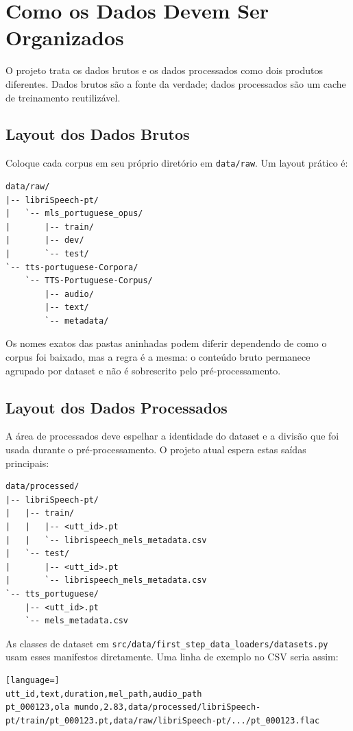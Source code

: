 \documentclass[11pt]{article}
\newcommand{\pathtt}[1]{\texttt{#1}}
\begin{document}
\section{Como os Dados Devem Ser Organizados}

O projeto trata os dados brutos e os dados processados como dois produtos diferentes. Dados brutos são a fonte da verdade; dados processados são um cache de treinamento reutilizável.

\subsection{Layout dos Dados Brutos}

Coloque cada corpus em seu próprio diretório em \pathtt{data/raw}. Um layout prático é:

\begin{lstlisting}
data/raw/
|-- libriSpeech-pt/
|   `-- mls_portuguese_opus/
|       |-- train/
|       |-- dev/
|       `-- test/
`-- tts-portuguese-Corpora/
    `-- TTS-Portuguese-Corpus/
        |-- audio/
        |-- text/
        `-- metadata/
\end{lstlisting}

Os nomes exatos das pastas aninhadas podem diferir dependendo de como o corpus foi baixado, mas a regra é a mesma: o conteúdo bruto permanece agrupado por dataset e não é sobrescrito pelo pré-processamento.

\subsection{Layout dos Dados Processados}

A área de processados deve espelhar a identidade do dataset e a divisão que foi usada durante o pré-processamento. O projeto atual espera estas saídas principais:

\begin{lstlisting}
data/processed/
|-- libriSpeech-pt/
|   |-- train/
|   |   |-- <utt_id>.pt
|   |   `-- librispeech_mels_metadata.csv
|   `-- test/
|       |-- <utt_id>.pt
|       `-- librispeech_mels_metadata.csv
`-- tts_portuguese/
    |-- <utt_id>.pt
    `-- mels_metadata.csv
\end{lstlisting}

As classes de dataset em \pathtt{src/data/first\_step\_data\_loaders/datasets.py} usam esses manifestos diretamente. Uma linha de exemplo no CSV seria assim:

\begin{lstlisting}[language=]
utt_id,text,duration,mel_path,audio_path
pt_000123,ola mundo,2.83,data/processed/libriSpeech-pt/train/pt_000123.pt,data/raw/libriSpeech-pt/.../pt_000123.flac
\end{lstlisting}
\end{document}

